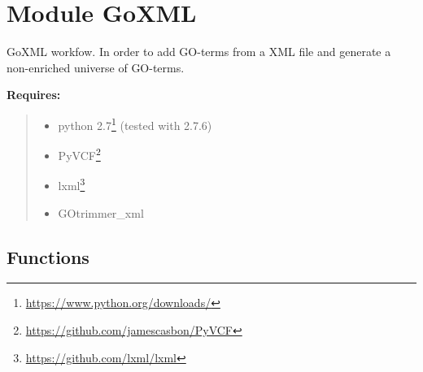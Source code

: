 %
%
%


\section{Module GoXML}

    \label{GoXML}
GoXML workfow. In order to add GO-terms from a XML file and generate a 
non-enriched universe of GO-terms.

\textbf{Requires:}
\begin{quote}
  \begin{itemize}

  \item
    \setlength{\parskip}{0.6ex}
python 
2.7\footnote{\href{https://www.python.org/downloads/}{https://www.python.org/downloads/}}
(tested with 2.7.6)



  \item PyVCF\footnote{\href{https://github.com/jamescasbon/PyVCF}{https://github.com/jamescasbon/PyVCF}}



  \item lxml\footnote{\href{https://github.com/lxml/lxml}{https://github.com/lxml/lxml}}



  \item GOtrimmer\_xml



\end{itemize}

\end{quote}



  \subsection{Functions}

    \label{GoXML:get_parser}

